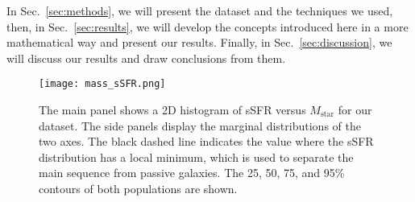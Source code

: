\documentclass[fleqn,usenatbib]{mnras}
\begin{document}
In Sec.~\ref{sec:methods}, we will present the dataset and the techniques we used, then, in Sec.~\ref{sec:results}, we will develop the concepts introduced here in a more mathematical way and present our results. Finally, in Sec.~\ref{sec:discussion}, we will discuss our results and draw conclusions from them.

\begin{figure}\centering
	\texttt{[image: mass\_sSFR.png]}
    \caption{The main panel shows a 2D histogram of sSFR versus $M_\text{star}$ for our dataset. The side panels display the marginal distributions of the two axes. The black dashed line indicates the value where the sSFR distribution has a local minimum, which is used to separate the main sequence from passive galaxies. The 25, 50, 75, and 95\% contours of both populations are shown.}
    \label{fig:mass_sSFR}
\end{figure}
\end{document}
